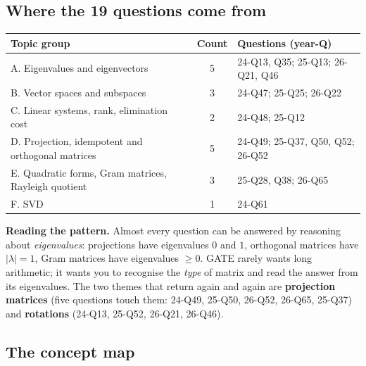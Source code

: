 \documentclass[11pt,a4paper]{article}
\begin{document}
\subsection{Where the 19 questions come from}
\begin{center}
\small
\begin{tabularx}{\textwidth}{>{\raggedright\arraybackslash}p{5.0cm}cX}
\toprule
\textbf{Topic group} & \textbf{Count} & \textbf{Questions (year-Q)}\\\midrule
A. Eigenvalues and eigenvectors & 5 & 24-Q13, Q35; 25-Q13; 26-Q21, Q46\\
B. Vector spaces and subspaces & 3 & 24-Q47; 25-Q25; 26-Q22\\
C. Linear systems, rank, elimination cost & 2 & 24-Q48; 25-Q12\\
D. Projection, idempotent and orthogonal matrices & 5 & 24-Q49; 25-Q37, Q50, Q52; 26-Q52\\
E. Quadratic forms, Gram matrices, Rayleigh quotient & 3 & 25-Q28, Q38; 26-Q65\\
F. SVD & 1 & 24-Q61\\
\bottomrule
\end{tabularx}
\end{center}
\textbf{Reading the pattern.} Almost every question can be answered by reasoning about \emph{eigenvalues}: projections have eigenvalues $0$ and $1$, orthogonal matrices have $|\lambda|=1$, Gram matrices have eigenvalues $\ge0$. GATE rarely wants long arithmetic; it wants you to recognise the \emph{type} of matrix and read the answer from its eigenvalues. The two themes that return again and again are \textbf{projection matrices} (five questions touch them: 24-Q49, 25-Q50, 26-Q52, 26-Q65, 25-Q37) and \textbf{rotations} (24-Q13, 25-Q52, 26-Q21, 26-Q46).

\subsection{The concept map}
\begin{center}
\end{center}
\end{document}
